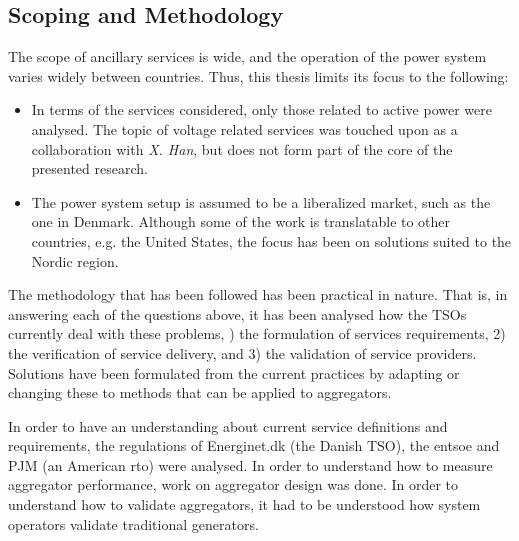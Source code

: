 \subsection*{Scoping and Methodology}
The scope of ancillary services is wide, and the operation of the power system varies widely between countries. Thus, this thesis limits its focus to the following:
\begin{itemize}
	\item In terms of the services considered, only those related to active power were analysed. The topic of voltage related services was touched upon as a collaboration with \emph{X. Han}, but does not form part of the core of the presented research.
	\item The power system setup is assumed to be a liberalized market, such as the one in Denmark. Although some of the work is translatable to other countries, e.g. the United States, the focus has been on solutions suited to the Nordic region.
\end{itemize}

The methodology that has been followed has been practical in nature. That is, in answering each of the questions above, it has been analysed how the TSOs currently deal with these problems, ) the formulation of services requirements, 2) the verification of service delivery, and 3) the validation of service providers. Solutions have been formulated from the current practices by adapting or changing these to methods that can be applied to aggregators.

In order to have an understanding about current service definitions and requirements, the regulations of Energinet.dk (the Danish TSO), the \gls{entsoe} and PJM (an American \gls{rto}) were analysed. In order to understand how to measure aggregator performance, work on aggregator design was done. In order to understand how to validate aggregators, it had to be understood how system operators validate traditional generators.

